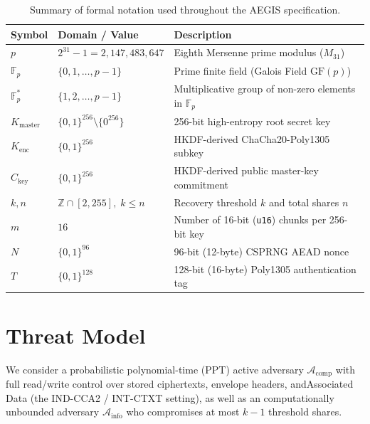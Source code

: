 \documentclass[11pt,a4paper]{article}
\theoremstyle{definition}
\newcommand{\Fp}{\mathbb{F}_p}
\newcommand{\Fps}{\mathbb{F}_p^*}
\newcommand{\Z}{\mathbb{Z}}
\begin{document}
\begin{table}[h!]
\centering
\begin{tabular}{@{}lll@{}}
\toprule
\textbf{Symbol} & \textbf{Domain / Value} & \textbf{Description} \\ \midrule
$p$ & $2^{31} - 1 = 2,147,483,647$ & Eighth Mersenne prime modulus ($M_{31}$) \\
$\Fp$ & $\{0, 1, \dots, p-1\}$ & Prime finite field (Galois Field $\mathrm{GF}(p)$) \\
$\Fps$ & $\{1, 2, \dots, p-1\}$ & Multiplicative group of non-zero elements in $\Fp$ \\
$K_{\mathrm{master}}$ & $\{0,1\}^{256} \setminus \{0^{256}\}$ & 256-bit high-entropy root secret key \\
$K_{\mathrm{enc}}$ & $\{0,1\}^{256}$ & HKDF-derived ChaCha20-Poly1305 subkey \\
$C_{\mathrm{key}}$ & $\{0,1\}^{256}$ & HKDF-derived public master-key commitment \\
$k, n$ & $\Z \cap [2, 255],\; k \le n$ & Recovery threshold $k$ and total shares $n$ \\
$m$ & $16$ & Number of 16-bit (\texttt{u16}) chunks per 256-bit key \\
$N$ & $\{0,1\}^{96}$ & 96-bit (12-byte) CSPRNG AEAD nonce \\
$T$ & $\{0,1\}^{128}$ & 128-bit (16-byte) Poly1305 authentication tag \\ \bottomrule
\end{tabular}
\caption{Summary of formal notation used throughout the AEGIS specification.}
\end{table}

\section{Threat Model}

We consider a probabilistic polynomial-time (PPT) active adversary $\mathcal{A}_{\mathrm{comp}}$ with full read/write control over stored ciphertexts, envelope headers, andAssociated Data (the IND-CCA2 / INT-CTXT setting), as well as an computationally unbounded adversary $\mathcal{A}_{\mathrm{info}}$ who compromises at most $k - 1$ threshold shares.
\end{document}

